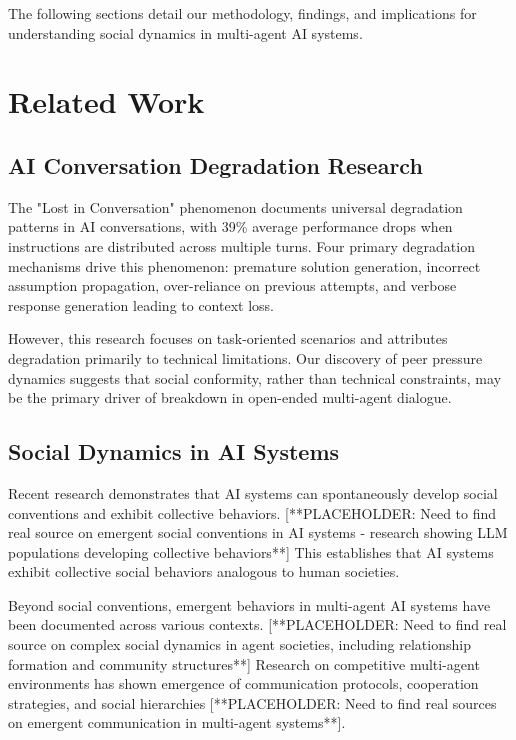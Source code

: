 \documentclass[11pt,letterpaper]{article}
\begin{document}
The following sections detail our methodology, findings, and implications for understanding social dynamics in multi-agent AI systems.
\section{Related Work}

\subsection{AI Conversation Degradation Research}

The "Lost in Conversation" phenomenon \citep{laban2025lost} documents universal degradation patterns in AI conversations, with 39\% average performance drops when instructions are distributed across multiple turns. Four primary degradation mechanisms drive this phenomenon: premature solution generation, incorrect assumption propagation, over-reliance on previous attempts, and verbose response generation leading to context loss.

However, this research focuses on task-oriented scenarios and attributes degradation primarily to technical limitations. Our discovery of peer pressure dynamics suggests that social conformity, rather than technical constraints, may be the primary driver of breakdown in open-ended multi-agent dialogue.

\subsection{Social Dynamics in AI Systems}

Recent research demonstrates that AI systems can spontaneously develop social conventions and exhibit collective behaviors. [**PLACEHOLDER: Need to find real source on emergent social conventions in AI systems - research showing LLM populations developing collective behaviors**] This establishes that AI systems exhibit collective social behaviors analogous to human societies.

Beyond social conventions, emergent behaviors in multi-agent AI systems have been documented across various contexts. [**PLACEHOLDER: Need to find real source on complex social dynamics in agent societies, including relationship formation and community structures**] Research on competitive multi-agent environments has shown emergence of communication protocols, cooperation strategies, and social hierarchies [**PLACEHOLDER: Need to find real sources on emergent communication in multi-agent systems**].
\end{document}
